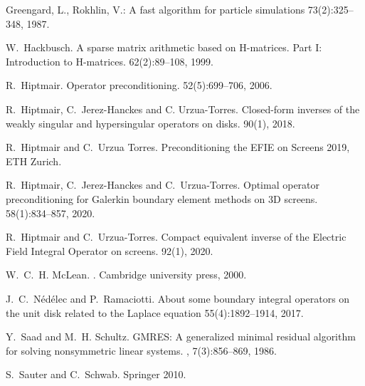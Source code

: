 \documentclass[]{article}
\begin{document}
\begin{small}
\begin{thebibliography}{0}
		Greengard, L., Rokhlin, V.:
		\newblock A fast algorithm for particle simulations
		 73(2):325--348, 1987.
		
		W.~Hackbusch.
		\newblock A sparse matrix arithmetic based on H-matrices. Part I: Introduction to H-matrices.
		 62(2):89--108, 1999.
		
		R.~Hiptmair.
		\newblock Operator preconditioning.
		 52(5):699--706, 2006.
		
		
		R.~Hiptmair, C.~Jerez-Hanckes and C. Urzua-Torres.
		\newblock Closed-form inverses of the weakly singular and hypersingular operators on disks.
		 90(1), 2018.
		
		
		R.~Hiptmair and C.~Urzua Torres.
		Preconditioning the EFIE on Screens
		 2019, ETH Zurich.
		
		
		R.~Hiptmair, C.~Jerez-Hanckes and C.~Urzua-Torres.
		\newblock Optimal operator preconditioning for Galerkin boundary element methods on 3D screens. 
		 58(1):834--857, 2020.
		
		R.~Hiptmair and C.~Urzua-Torres.
		\newblock Compact equivalent inverse of the {E}lectric {F}ield
		{I}ntegral {O}perator on screens.
		 92(1), 2020.

		
		W.~C.~H. McLean.
		.
		\newblock Cambridge university press, 2000.
		
		J.~C.~Nédélec and P.~Ramaciotti.
		\newblock About some boundary integral operators on the unit disk related to the Laplace equation
		 55(4):1892--1914, 2017.
		
		
		Y.~Saad and M.~H. Schultz.
		\newblock GMRES: A generalized minimal residual algorithm for solving
		nonsymmetric linear systems.
		,
		7(3):856--869, 1986.
		
		S.~Sauter and C.~Schwab.
		\newblock Springer 2010.
		

\end{thebibliography}
\end{small}
\end{document}

